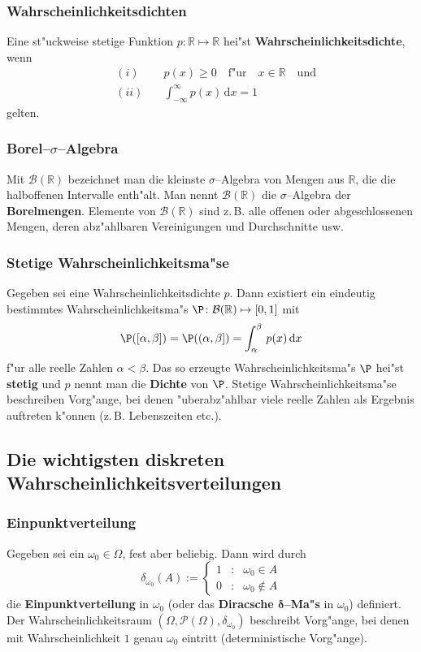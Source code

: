 \documentclass[ngerman,draft,parskip=half,twoside]{scrartcl}
\newcommand*{\R}{\mathbb{R}}      %
\newcommand*{\BorelM}{\mathcal{B}}  %
\newcommand*{\PotM}{\mathcal{P}}    %
\begin{document}
\subsubsection{Wahrscheinlichkeitsdichten}
Eine st"uckweise stetige Funktion $p\colon\R\mapsto\R$ hei"st
\textbf{Wahrscheinlichkeitsdichte}, wenn
\begin{eqnarray*}
&(i)&\quad p(x)\ge 0\quad\mbox{f"ur}\quad x\in\R\quad \mbox{und}\\
&(ii)&\quad\int_{-\infty}^\infty p(x)\,\mathrm d x=1
\end{eqnarray*}
gelten.
\subsubsection{Borel--$\sigma$--Algebra}
Mit $\BorelM(\R)$ bezeichnet man die kleinste $\sigma$--Algebra von Mengen aus $\R$, die
die halboffenen Intervalle enth"alt. Man nennt $\BorelM(\R)$ die $\sigma$--Algebra der
\textbf{Borelmengen}. Elemente von $\BorelM(\R)$ sind z.\,B. alle offenen oder abgeschlossenen Mengen,
deren abz"ahlbaren Vereinigungen und Durchschnitte usw.
\subsubsection{Stetige Wahrscheinlichkeitsma"se}
Gegeben sei eine Wahrscheinlichkeitsdichte $p$. Dann existiert ein eindeutig bestimmtes
Wahrscheinlichkeitsma"s $\P \colon\BorelM(\R)\mapsto [0,1]$ mit
$$
\P([\alpha,\beta])=\P((\alpha,\beta])=\int_\alpha^\beta\,p(x)\,\mathrm dx
$$
f"ur alle reelle Zahlen $\alpha<\beta$. Das so erzeugte Wahrscheinlichkeitsma"s $\P$ hei"st \textbf{stetig}
und $p$ nennt man die \textbf{Dichte} von $\P$. Stetige Wahrscheinlichkeitsma"se beschreiben Vorg"ange,
bei denen "uberabz"ahlbar viele reelle Zahlen als Ergebnis auftreten k"onnen (z.\,B. Lebenszeiten etc.).
\subsection{Die wichtigsten diskreten Wahrscheinlichkeitsverteilungen}

\subsubsection{Einpunktverteilung}
Gegeben sei ein $\omega_0\in \Omega$, fest aber beliebig. Dann wird
durch
$$
\delta_{\omega_0}(A):=\left\{
\begin{array}{rcl}
1 &:& \omega_0\in A\\
0 &:& \omega_0\notin A
\end{array}
\right.
$$
die \textbf{Einpunktverteilung} in $\omega_0$ (oder das \textbf{Diracsche $\mathbf \delta$--Ma"s} in
$\omega_0$) definiert. Der Wahrscheinlichkeitsraum $(\Omega,\PotM(\Omega),\delta_{\omega_0})$
beschreibt Vorg"ange, bei denen mit Wahrscheinlichkeit $1$ genau $\omega_0$ eintritt (deterministische
Vorg"ange).
\end{document}
